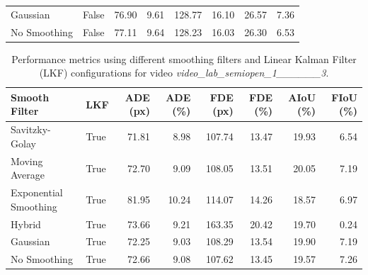 \documentclass[12pt,oneside]{book} %
\begin{document}
\begin{table}[H]
\begin{adjustbox}{max width=\textwidth}
\begin{tabular}{llrrrrrr}
            Gaussian               & False        & 76.90             & 9.61              & 128.77            & 16.10             & 26.57              & 7.36               \\
            No Smoothing           & False        & 77.11             & 9.64              & 128.23            & 16.03             & 26.30              & 6.53               \\
            \bottomrule
        \end{tabular}
    \end{adjustbox}
    \label{tab:performance_metrics_json}
\end{table}

\begin{table}[H]
    \centering
    \caption{Performance metrics using different smoothing filters and Linear Kalman Filter (LKF) configurations for video \textit{video\_lab\_semiopen\_1\_\_\_\_\_\_3}.}
    \begin{adjustbox}{max width=\textwidth}
        \begin{tabular}{llrrrrrr}
            \toprule
            \textbf{Smooth Filter} & \textbf{LKF} & \textbf{ADE (px)} & \textbf{ADE (\%)} & \textbf{FDE (px)} & \textbf{FDE (\%)} & \textbf{AIoU (\%)} & \textbf{FIoU (\%)} \\
            \midrule
            Savitzky-Golay         & True         & 71.81             & 8.98              & 107.74            & 13.47             & 19.93              & 6.54               \\
            Moving Average         & True         & 72.70             & 9.09              & 108.05            & 13.51             & 20.05              & 7.19               \\
            Exponential Smoothing  & True         & 81.95             & 10.24             & 114.07            & 14.26             & 18.57              & 6.97               \\
            Hybrid                 & True         & 73.66             & 9.21              & 163.35            & 20.42             & 19.70              & 0.24               \\
            Gaussian               & True         & 72.25             & 9.03              & 108.29            & 13.54             & 19.90              & 7.19               \\
            No Smoothing           & True         & 72.66             & 9.08              & 107.62            & 13.45             & 19.57              & 7.26               \\

\end{tabular}
\end{adjustbox}
\end{table}
\end{document}
